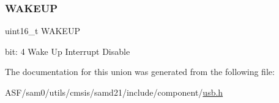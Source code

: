 \subsubsection{\texorpdfstring{WAKEUP}{WAKEUP}}
{\footnotesize\ttfamily uint16\+\_\+t W\+A\+K\+E\+UP}

bit\+: 4 Wake Up Interrupt Disable 

The documentation for this union was generated from the following file\+:\begin{DoxyCompactItemize}
\item 
A\+S\+F/sam0/utils/cmsis/samd21/include/component/\mbox{\hyperlink{component_2usb_8h}{usb.\+h}}\end{DoxyCompactItemize}
